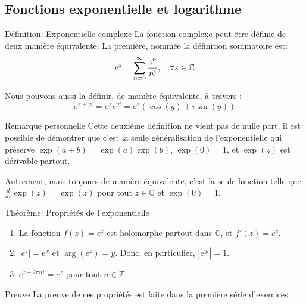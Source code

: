 \documentclass[a4paper]{article}
\begin{document}
\subsection{Fonctions exponentielle et logarithme}
\begin{parag}{Définition: Exponentielle complexe}
    La fonction  complexe peut être définie de deux manière équivalente. La première, nommée la définition sommatoire est: 
    \[e^{z} = \sum_{n=0}^{\infty} \frac{z^n}{n!}, \quad \forall z \in \mathbb{C}\]
    
    Nous pouvons aussi la définir, de manière équivalente, à travers : 
    \[e^{x + yi} = e^{x} e^{yi} = e^{x}\left(\cos\left(y\right) + i\sin\left(y\right)\right)\]

    \begin{subparag}{Remarque personnelle}
        Cette deuxième définition ne vient pas de nulle part, il est possible de démontrer que c'est la seule généralisation de l'exponentielle qui préserve $\exp\left(a + b\right) = \exp\left(a\right)\exp\left(b\right)$, $\exp\left(0\right) = 1$, et $\exp\left(z\right)$ est dérivable partout.

        Autrement, mais toujours de manière équivalente, c'est la seule fonction telle que $\frac{d}{dz} \exp\left(z\right) = \exp\left(z\right)$ pour tout $z \in \mathbb{C}$ et $\exp\left(0\right) = 1$.
    \end{subparag}
\end{parag}

\begin{parag}{Théorème: Propriétés de l'exponentielle}
    \begin{enumerate}[left=0pt]
        \item La fonction $f\left(z\right) = e^z$ est holomorphe partout dans $\mathbb{C}$, et $f'\left(z\right) = e^z$.
        \item $\left|e^z\right| = e^x$ et $\arg\left(e^z\right) = y$. Donc, en particulier, $\left|e^{yi}\right| = 1$.
        \item $e^{z + 2\pi n i} = e^{z}$ pour tout $n \in \mathbb{Z}$.
    \end{enumerate}

    \begin{subparag}{Preuve}
        La preuve de ces propriétés est faite dans la première série d'exercices.
    \end{subparag}
    
\end{parag}
\end{document}
